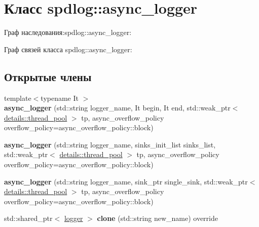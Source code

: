 \hypertarget{classspdlog_1_1async__logger}{}\section{Класс spdlog\+:\+:async\+\_\+logger}
\label{classspdlog_1_1async__logger}


Граф наследования\+:spdlog\+:\+:async\+\_\+logger\+:


Граф связей класса spdlog\+:\+:async\+\_\+logger\+:
\subsection*{Открытые члены}
\begin{DoxyCompactItemize}
\item 
\mbox{\label{classspdlog_1_1async__logger_a2a74bf8d8d850ea760396ba8ae55d552}} 
{\footnotesize template$<$typename It $>$ }\\{\bfseries async\+\_\+logger} (std\+::string logger\+\_\+name, It begin, It end, std\+::weak\+\_\+ptr$<$ \hyperlink{classspdlog_1_1details_1_1thread__pool}{details\+::thread\+\_\+pool} $>$ tp, async\+\_\+overflow\+\_\+policy overflow\+\_\+policy=async\+\_\+overflow\+\_\+policy\+::block)
\item 
\mbox{\label{classspdlog_1_1async__logger_a3164595d226473d551d36ae07fdcc11a}} 
{\bfseries async\+\_\+logger} (std\+::string logger\+\_\+name, sinks\+\_\+init\+\_\+list sinks\+\_\+list, std\+::weak\+\_\+ptr$<$ \hyperlink{classspdlog_1_1details_1_1thread__pool}{details\+::thread\+\_\+pool} $>$ tp, async\+\_\+overflow\+\_\+policy overflow\+\_\+policy=async\+\_\+overflow\+\_\+policy\+::block)
\item 
\mbox{\label{classspdlog_1_1async__logger_a6f179d745c5618639bc5da8c40659b70}} 
{\bfseries async\+\_\+logger} (std\+::string logger\+\_\+name, sink\+\_\+ptr single\+\_\+sink, std\+::weak\+\_\+ptr$<$ \hyperlink{classspdlog_1_1details_1_1thread__pool}{details\+::thread\+\_\+pool} $>$ tp, async\+\_\+overflow\+\_\+policy overflow\+\_\+policy=async\+\_\+overflow\+\_\+policy\+::block)
\item 
\mbox{\label{classspdlog_1_1async__logger_a1ba06033da941175e6c3adf6cab0aeb9}} 
std\+::shared\+\_\+ptr$<$ \hyperlink{classspdlog_1_1logger}{logger} $>$ {\bfseries clone} (std\+::string new\+\_\+name) override
\end{DoxyCompactItemize}

